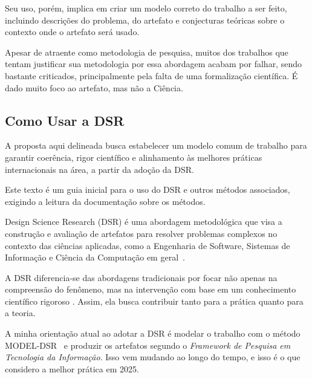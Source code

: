 Seu uso, porém, implica em criar um modelo correto do trabalho a ser feito, incluindo descrições do problema, do artefato e conjecturas teóricas sobre o contexto onde o artefato será usado.

Apesar de atraente como metodologia de pesquisa, muitos dos trabalhos que tentam justificar sua metodologia por essa abordagem acabam por falhar, sendo bastante criticados, principalmente pela falta de uma formalização científica. É dado muito foco ao artefato, mas não a Ciência\citet{Pimentel2019}.



\subsection{Como Usar a DSR}

A proposta aqui delineada busca estabelecer um modelo comum de trabalho para garantir coerência, rigor científico e alinhamento às melhores práticas internacionais na área, a partir da adoção da DSR. 

Este texto é um guia inicial para o uso do DSR e outros métodos associados, exigindo a leitura da documentação sobre os métodos.

Design Science Research (DSR) é uma abordagem metodológica que visa a construção e avaliação de artefatos para resolver problemas complexos no contexto das ciências aplicadas, como a Engenharia de Software, Sistemas de Informação e Ciência da Computação em geral~\citep{hevner2004design}. 

A DSR diferencia-se das abordagens tradicionais por focar não apenas na compreensão do fenômeno, mas na intervenção com base em um conhecimento científico rigoroso \cite{hevner2004design, peffers2007design}. Assim, ela busca contribuir tanto para a prática quanto para a teoria.

A minha orientação atual ao adotar a DSR é modelar o trabalho com o método MODEL-DSR~\citep{pimentel2019dsr,pimentel2023} e produzir os artefatos segundo o \textit{Framework de Pesquisa em Tecnologia da Informação}. Isso vem mudando ao longo do tempo, e isso é o que considero a melhor prática em 2025.


